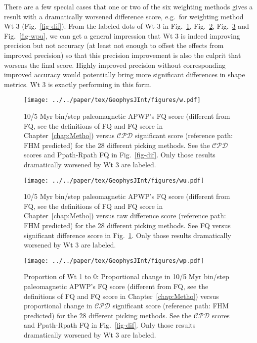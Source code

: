 There are a few special cases that one or two of the six weighting methods gives
a result with a dramatically worsened difference score, e.g.\ for weighting
method Wt 3 (Fig.~\ref{fig-dif}). From the labeled dots of Wt 3 in
Fig.~\ref{fig-w}, Fig.~\ref{fig-wu}, Fig.~\ref{fig-wp} and Fig.~\ref{fig-wpu},
we can get a general impression that Wt 3 is indeed improving precision
but not accuracy (at least not enough to offset the effects from improved
precision) so that this precision improvement is also the culprit that worsens
the final score. Highly improved precision without corresponding improved
accuracy would potentially bring more significant differences in shape metrics.
Wt 3 is exactly performing in this form.

\begin{figure}
\centering
\texttt{[image: ../../paper/tex/GeophysJInt/figures/w.pdf]}
\caption[Paleomagnetic APWP's FQ score vs significant difference score
(i.e. $\mathcal{CPD}$)]{10/5 Myr bin/step paleomagnetic APWP's FQ score (different
from FQ, see the definitions of FQ and FQ score in Chapter~\ref{chap:Metho})
versus $\mathcal{CPD}$ significant score (reference path: FHM predicted) for the
28 different picking methods. See the $\mathcal{CPD}$ scores and Ppath-Rpath FQ
in Fig.~\ref{fig-dif}. Only those results dramatically worsened by Wt 3
are labeled.}\label{fig-w}
\end{figure}

\begin{figure}
\centering
\texttt{[image: ../../paper/tex/GeophysJInt/figures/wu.pdf]}
\caption[Paleomagnetic APWP's FQ score vs raw difference score (no statistical testing)]{10/5 Myr
bin/step paleomagnetic APWP's FQ score (different from FQ, see the definitions
of FQ and FQ score in Chapter~\ref{chap:Metho}) versus raw difference score (reference path:
FHM predicted) for the 28 different picking methods. See FQ versus significant
difference score in Fig.~\ref{fig-w}. Only those results dramatically worsened
by Wt 3 are labeled.}\label{fig-wu}
\end{figure}

\begin{figure}
\centering
\texttt{[image: ../../paper/tex/GeophysJInt/figures/wp.pdf]}
\caption[Proportional changes of Wt 1 to 0: Paleomagnetic
APWP's FQ score vs $\mathcal{CPD}$]{Proportion of Wt
1 to 0: Proportional change in 10/5 Myr bin/step paleomagnetic
APWP's FQ score (different from FQ, see the definitions of FQ and FQ score in
Chapter~\ref{chap:Metho}) versus proportional change in $\mathcal{CPD}$ significant score
(reference path: FHM predicted) for the 28 different picking methods. See the
$\mathcal{CPD}$ scores and Ppath-Rpath FQ in Fig.~\ref{fig-dif}.
Only those results dramatically worsened by Wt 3 are
labeled.}\label{fig-wp}
\end{figure}

